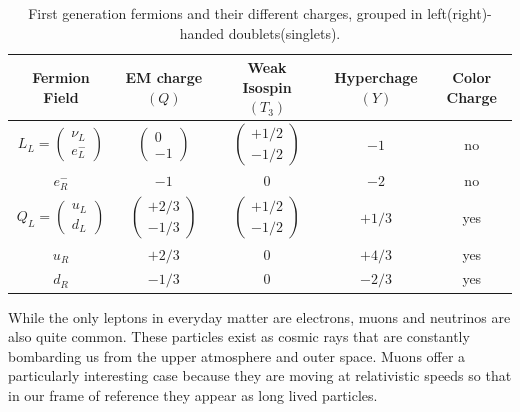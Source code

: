 \begin{table}
\begin{center}
\begin{tabular}{c|c|c|c||c}
\hline 
\hline
Fermion Field & EM charge $\left(Q\right)$ & Weak Isospin $\left(T_{3}\right)$ & Hyperchage $\left(Y\right)$ & Color Charge \\ \hline
$L_{L} = \begin{pmatrix} \nu_{L} \\ e^{-}_{L} \end{pmatrix}$ & $\begin{pmatrix} 0 \\ -1 \end{pmatrix}$ & $\begin{pmatrix} +1/2 \\ -1/2 \end{pmatrix}$ & $-1$ & no \\
$e_{R}^{-}$ & $-1$ & $0$ & $-2$ & no \\
\hline
$Q_{L} = \begin{pmatrix} u_{L} \\ d_{L} \end{pmatrix}$ & $\begin{pmatrix} +2/3 \\ -1/3 \end{pmatrix}$ & $\begin{pmatrix} +1/2 \\ -1/2 \end{pmatrix}$ & $+1/3$ & yes \\
$u_{R}$ & $+2/3$ & $0$ & $+4/3$ & yes \\
$d_{R}$ & $-1/3$ & $0$ & $-2/3$ & yes \\
\hline
\hline
\end{tabular}
\end{center}
\caption[First generation fermions and their different charges, grouped in left(right)-handed doublets(singlets).]{First generation fermions and their different charges, grouped in left(right)-handed doublets(singlets).}
\label{tab:FermionFields}
\end{table}


While the only leptons in everyday matter are electrons, muons and neutrinos are also quite common. These particles exist as cosmic rays that are constantly bombarding us from the upper atmosphere and outer space. Muons offer a particularly interesting case because they are moving at relativistic speeds so that in our frame of reference they appear as long lived particles.

